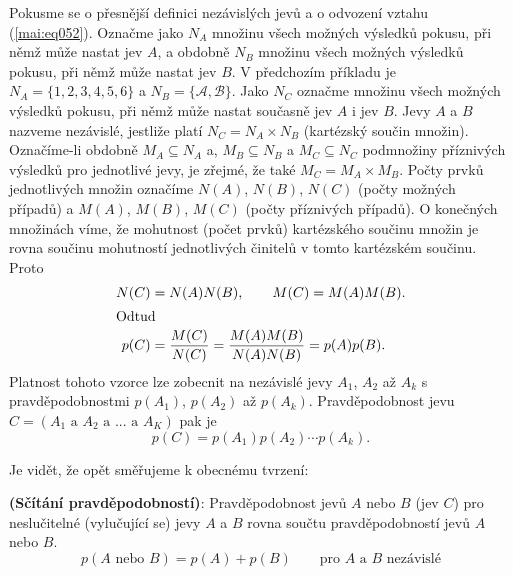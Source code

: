       Pokusme se o přesnější definici nezávislých jevů a o odvození vztahu (\ref{mai:eq052}). 
      Označme jako \(N_A\) množinu všech možných výsledků pokusu, při němž může nastat jev \(A\), a 
      obdobně \(N_B\) množinu všech možných výsledků pokusu, při němž může nastat jev \(B\). V 
      předchozím příkladu je \(N_A = \{1, 2, 3, 4, 5, 6\}\) a \(N_B = \{\mathcal{A}, 
      \mathcal{B}\}\). Jako \(N_C\) označme množinu všech možných výsledků pokusu, při němž může 
      nastat současně jev \(A\) i jev \(B\). Jevy \(A\) a \(B\) nazveme nezávislé, jestliže
      platí \(N_C = N_A \times N_B\) (kartézský součin množin). Označíme-li obdobně \(M_A \subseteq 
      N_A\) a, \(M_B \subseteq N_B\) a \(M_C \subseteq N_C\) podmnožiny příznivých výsledků pro 
      jednotlivé jevy, je zřejmé, že také \(M_C = M_A \times M_B\). Počty prvků jednotlivých množin 
      označíme \(N(A)\), \(N(B)\), \(N(C)\) (počty možných případů) a \(M(A)\), \(M(B)\), \(M(C)\) 
      (počty příznivých případů). O konečných množinách víme, že mohutnost (počet prvků) 
      kartézského součinu množin je rovna součinu mohutností jednotlivých
      činitelů v tomto kartézském součinu. Proto
      \begin{align*}
        N(C) &= N(A)N(B),\qquad M(C) = M(A)M(B). \\
        \shortintertext{Odtud}
        p(C) &= \dfrac{M(C)}{N(C)} = \dfrac{M(A)M(B)}{N(A)N(B)} = p(A)p(B).
      \end{align*}
      Platnost tohoto vzorce lze zobecnit na nezávislé jevy \(A_1\), \(A_2\) až \(A_k\) s 
      pravděpodobnostmi \(p(A_1)\), \(p(A_2)\) až \(p(A_k)\). Pravděpodobnost jevu \(C = (A_1\text{ 
      a }A_2\text{ a }...\text{ a }A_K)\) pak je
      \begin{equation*}
        p(C) = p(A_1)p(A_2)\cdots p(A_k).
      \end{equation*}
 
      
      
      Je vidět, že opět směřujeme k obecnému tvrzení:
      \begin{lemma}\label{mai:lemma004}
        \textbf{(Sčítání pravděpodobností)}: Pravděpodobnost jevů \(A\) nebo \(B\) (jev \(C\)) 
        pro neslučitelné (vylučující se) jevy \(A\) a \(B\) rovna součtu pravděpodobností jevů 
        \(A\) nebo \(B\).
        \begin{equation}\label{mai:eq053}
           p(A \text{ nebo } B)= p(A) + p(B)\qquad \text{pro } A \text{ a } B \text{ nezávislé}
        \end{equation}
      \end{lemma}
      
